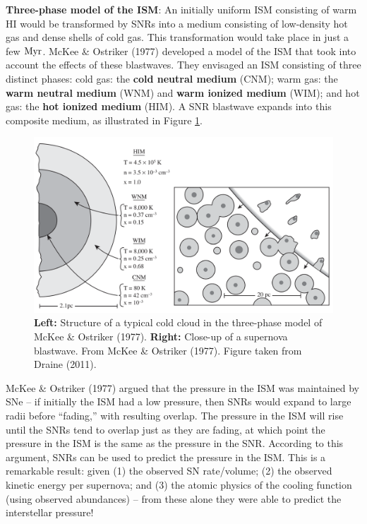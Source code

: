 \documentclass[a4paper,10pt]{article}
\begin{document}
{\noindent}\textbf{Three-phase model of the ISM}: An initially uniform ISM consisting of warm HI would be transformed by SNRs into a medium consisting of low-density hot gas and dense shells of cold gas. This transformation would take place in just a few ${\rm Myr}$. McKee \& Ostriker (1977) developed a model of the ISM that took into account the effects of these blastwaves. They envisaged an ISM consisting of three distinct phases: cold gas: the \textbf{cold neutral medium} (CNM); warm gas: the \textbf{warm neutral medium} (WNM) and \textbf{warm ionized medium} (WIM); and hot gas: the \textbf{hot ionized medium} (HIM). A SNR blastwave expands into this composite medium, as illustrated in Figure \ref{fig:3phaseism}.

\begin{figure}[h]
    \centering
    \includegraphics[width=14cm]{figures/3phaseISM.png}
    \caption{\footnotesize{\textbf{Left:} Structure of a typical cold cloud in the three-phase model of McKee \& Ostriker (1977). \textbf{Right:} Close-up of a supernova blastwave. From McKee \& Ostriker (1977). Figure taken from Draine (2011).}}
    \label{fig:3phaseism}
\end{figure}

{\noindent}McKee \& Ostriker (1977) argued that the pressure in the ISM was maintained by SNe -- if initially the ISM had a low pressure, then SNRs would expand to large radii before ``fading,'' with resulting overlap. The pressure in the ISM will rise until the SNRs tend to overlap just as they are fading, at which point the pressure in the ISM is the same as the pressure in the SNR. According to this argument, SNRs can be used to predict the pressure in the ISM. This is a remarkable result: given (1) the observed SN rate/volume; (2) the observed kinetic energy per supernova; and (3) the atomic physics of the cooling function (using observed abundances) -- from these alone they were able to predict the interstellar pressure!
\end{document}
